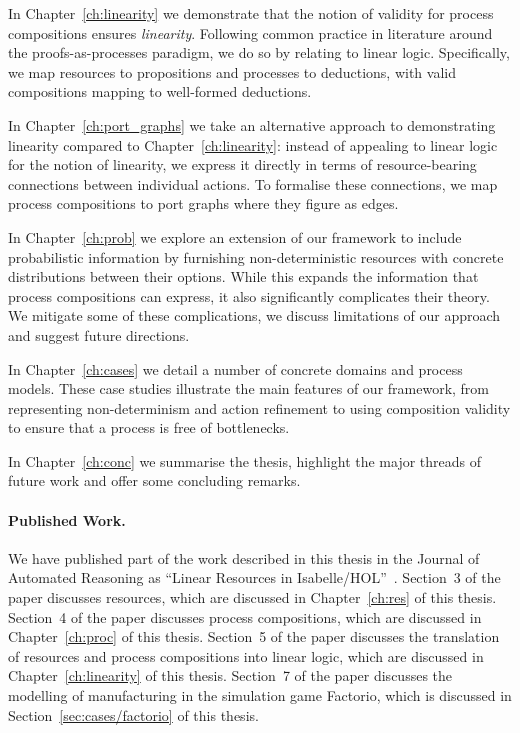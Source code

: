 \documentclass[class=smolathesis,crop=false]{standalone}
\begin{document}
In Chapter~\ref{ch:linearity} we demonstrate that the notion of validity for process compositions ensures \emph{linearity}.
Following common practice in literature around the proofs-as-processes paradigm, we do so by relating to linear logic.
Specifically, we map resources to propositions and processes to deductions, with valid compositions mapping to well-formed deductions.

In Chapter~\ref{ch:port_graphs} we take an alternative approach to demonstrating linearity compared to Chapter~\ref{ch:linearity}: instead of appealing to linear logic for the notion of linearity, we express it directly in terms of resource-bearing connections between individual actions.
To formalise these connections, we map process compositions to port graphs where they figure as edges.

In Chapter~\ref{ch:prob} we explore an extension of our framework to include probabilistic information by furnishing non-deterministic resources with concrete distributions between their options.
While this expands the information that process compositions can express, it also significantly complicates their theory.
We mitigate some of these complications, we discuss limitations of our approach and suggest future directions.

In Chapter~\ref{ch:cases} we detail a number of concrete domains and process models.
These case studies illustrate the main features of our framework, from representing non-determinism and action refinement to using composition validity to ensure that a process is free of bottlenecks.

In Chapter~\ref{ch:conc} we summarise the thesis, highlight the major threads of future work and offer some concluding remarks.

\paragraph*{Published Work.}
We have published part of the work described in this thesis in the Journal of Automated Reasoning as ``Linear Resources in Isabelle/HOL''~\cite{smola_fleuriot-2024}.
Section~3 of the paper discusses resources, which are discussed in Chapter~\ref{ch:res} of this thesis.
Section~4 of the paper discusses process compositions, which are discussed in Chapter~\ref{ch:proc} of this thesis.
Section~5 of the paper discusses the translation of resources and process compositions into linear logic, which are discussed in Chapter~\ref{ch:linearity} of this thesis.
Section~7 of the paper discusses the modelling of manufacturing in the simulation game Factorio, which is discussed in Section~\ref{sec:cases/factorio} of this thesis.
\end{document}
